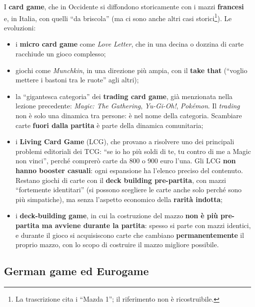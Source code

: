 I \textbf{card game}, che in Occidente si diffondono storicamente con i mazzi
\textbf{francesi} e, in Italia, con quelli ``da briscola'' (ma ci sono anche altri
casi storici\footnote{La trascrizione cita i ``Mazda 1''; il riferimento non è
ricostruibile.}). Le evoluzioni:
\begin{itemize}
  \item i \textbf{micro card game} come \emph{Love Letter}, che in una decina o
        dozzina di carte racchiude un gioco complesso;
  \item giochi come \emph{Munchkin}, in una direzione più ampia, con il
        \textbf{take that} (``voglio mettere i bastoni tra le ruote'' agli altri);
  \item la ``gigantesca categoria'' dei \textbf{trading card game}, già
        menzionata nella lezione precedente: \emph{Magic: The Gathering},
        \emph{Yu-Gi-Oh!}, \emph{Pokémon}. Il \emph{trading} non è solo una
        dinamica tra persone: è nel nome della categoria. Scambiare carte
        \textbf{fuori dalla partita} è parte della dinamica comunitaria;
  \item i \textbf{Living Card Game} (LCG), che provano a risolvere uno dei
        principali problemi editoriali dei TCG: ``se io ho più soldi di te, tu
        contro di me a Magic non vinci'', perché comprerò carte da 800 o 900
        euro l'una. Gli LCG \textbf{non hanno booster casuali}: ogni espansione ha
        l'elenco preciso del contenuto. Restano giochi di carte con il
        \textbf{deck building pre-partita}, con mazzi ``fortemente identitari''
        (si possono scegliere le carte anche solo perché sono più simpatiche),
        ma senza l'aspetto economico della \textbf{rarità indotta};
  \item i \textbf{deck-building game}, in cui la costruzione del mazzo
        \textbf{non è più pre-partita ma avviene durante la partita}: spesso si
        parte con mazzi identici, e durante il gioco si acquisiscono carte che
        cambiano \textbf{permanentemente} il proprio mazzo, con lo scopo di
        costruire il mazzo migliore possibile.
\end{itemize}

\subsection{German game ed Eurogame}




